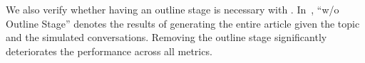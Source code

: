 We also verify whether having an outline stage is necessary with \system. In~, ``\system w/o Outline Stage'' denotes the results of generating the entire article given the topic and the simulated conversations. %
Removing the outline stage significantly deteriorates the performance across all metrics.










